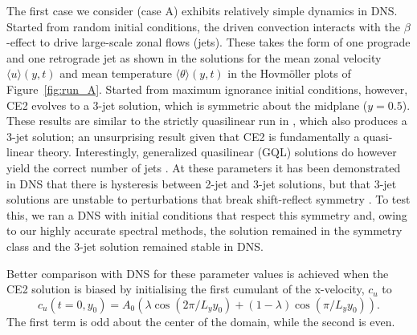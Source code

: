 \documentclass{jfm}
\newcommand{\cu}{c_u}
\begin{document}
The first case we consider (case A) exhibits relatively simple dynamics in DNS. Started from random initial conditions, the driven convection interacts with the $\beta$-effect to drive large-scale zonal flows (jets). These takes the form of one prograde and one retrograde jet as shown in the solutions for the mean zonal velocity $\langle u \rangle(y, t)$ and mean temperature $\langle \theta\rangle(y,t) $ in the Hovm\"oller plots of Figure~\ref{fig:run_A}. 
Started from maximum ignorance initial conditions, however, CE2 evolves to a 3-jet solution, which is symmetric about the midplane ($y=0.5$). These results are similar to the strictly quasilinear run in \citet{tom_2018}, which also produces a 3-jet solution; an unsurprising result given that 
 CE2 is fundamentally a quasi-linear theory. Interestingly, generalized quasilinear (GQL) solutions do however yield the correct number of jets \citet{tom_2018}. At these parameters it has been demonstrated in DNS that there is hysteresis between 2-jet and 3-jet solutions, but that 3-jet solutions are unstable to perturbations that break shift-reflect symmetry \citep{bh1993}. To test this, we ran a DNS with initial conditions that respect this symmetry and, owing to our highly accurate spectral methods, the solution remained in the symmetry class and the 3-jet solution remained stable in DNS.

Better comparison with DNS for these parameter values is achieved when the CE2 solution is biased 
 by initialising the first cumulant of the x-velocity, $\cu$ to
\begin{equation}
  \label{eq:bias}
  \cu(t=0, y_0) = A_0 \left( \lambda \cos(2\pi/L_y y_0) + (1-\lambda) \cos (\pi/L_y y_0)\right).
\end{equation}
The first term is odd about the center of the domain, while the second is even.
\end{document}

